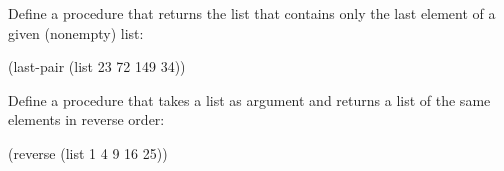\begin{exercise}
	\label{Exercise 2.17}
	Define a procedure  that returns the list that contains only the last element of a given (nonempty) list:
	\begin{scheme}
	  (last-pair (list 23 72 149 34))
	  ~~
	\end{scheme}
\end{exercise}



\begin{exercise}
	\label{Exercise 2.18}
	Define a procedure  that takes a list as argument and returns a list of the same elements in reverse order:
	\begin{scheme}
	  (reverse (list 1 4 9 16 25))
	  ~\outprint{(25 16 9 4 1)}~
	\end{scheme}
\end{exercise}



